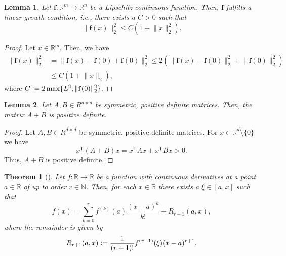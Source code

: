 \documentclass[12pt]{article}
\newtheorem{theorem}{Theorem}[section]
\newtheorem{lemma}[lemma]{Lemma}
\theoremstyle{definition}
\numberwithin{equation}{section}
\newcommand{\N}{\mathbb{N}}
\newcommand{\R}{\mathbb{R}}
\newcommand{\T}{\mathsf{T}}
\newcommand{\norm}[1]{\lVert{#1}\rVert_2}
\newcommand{\defeq}{\vcentcolon=}
\begin{document}
\begin{lemma}
  \label{lemma:linear_growth}
  Let $\mathbf{f} : \R^m \rightarrow \R^n$ be a Lipschitz continuous function. Then, $\mathbf{f}$ fulfills a linear growth condition, i.e., there exists a $C > 0$ such that 
  \begin{equation*}
    \norm{\mathbf{f}(x)}^2 \leq C (1 + \norm{x}^2).
  \end{equation*}
\end{lemma}
\begin{proof}
  Let $x \in \R^m$. Then, we have
  \begin{align*}
    \norm{\mathbf{f}(x)}^2 &= \norm{\mathbf{f}(x) - \mathbf{f}(0) + \mathbf{f}(0)}^2 \leq 2 \left( \norm{\mathbf{f}(x) - \mathbf{f}(0)}^2 + \norm{\mathbf{f}(0)}^2\right) \\
    &\leq C(1+\norm{x}),
  \end{align*}
  where $C \defeq 2\max\{L^2, \norm{\mathbf{f}(0)}^2\}$.
\end{proof}
\begin{lemma}
  \label{lem:sum_positive_definite}
  Let $A,B \in R^{d \times d}$ be symmetric, positive definite matrices. Then, the matrix $A+B$ is positive definite.
\end{lemma}
\begin{proof}
  Let $A,B \in R^{d \times d}$ be symmetric, positive definite matrices. For $x \in \R^d \setminus \{0\}$ we have
  \begin{equation*}
    x^\T(A+B)x = x^\T A x + x^\T B x > 0.
  \end{equation*}
  Thus, $A+B$ is positive definite.
\end{proof}
\begin{theorem}[]
  \label{thm:taylor}
  Let $f : \R \rightarrow \R$ be a function with continuous derivatives at a point $a \in \R$ of up to order $r \in \N$. Then, for each $x \in \R$ there exists a $\xi \in [a,x]$ such that 
  \begin{equation*}
    f(x) = \sum_{k=0}^r f^{(k)}(a) \frac{(x-a)^k}{k!} + R_{r+1}(a,x),
  \end{equation*}
  where the \emph{remainder} is given by
  \begin{equation*}
    R_{r+1}(a,x) \defeq \frac{1}{(r+1)!}f^{(r+1)}(\xi)(x-a)^{r+1}.
  \end{equation*}
\end{theorem}
\end{document}
